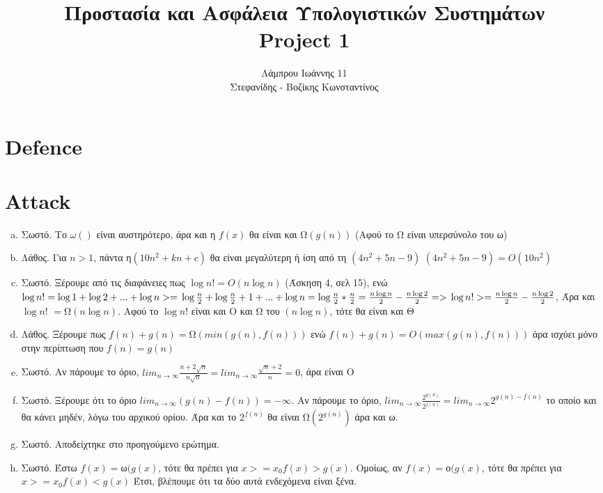 \documentclass{article}
\begin{document}
\title{\vspace{-3.5cm}\textbf{Προστασία και Ασφάλεια Υπολογιστικών Συστημάτων}\\\textlatin{Project} 1}
\author{Λάμπρου Ιωάννης 11\\ Στεφανίδης - Βοζίκης Κωνσταντίνος}

\maketitle
\section*{\textlatin{Defence}}



\section*{\textlatin{Attack}}
\begin{enumerate}[(a)]%
\item
Σωστό. Το $\omega{()}$ είναι αυστηρότερο, άρα και η $f(x)$ θα είναι και  Ω$(g(n))$ (Αφού το Ω είναι υπερσύνολο του ω)
\item
Λάθος. Για $n > 1$, πάντα η$(10n^2 + kn + c)$ θα είναι μεγαλύτερη ή ίση από τη $(4n^2 + 5n - 9)$ $(4n^2 + 5n - 9) = O(10n^2)$ 
\item
Σωστό. Ξέρουμε από τις διαφάνειες πως $\log{n!} = O(n\log{n})$ (Άσκηση 4, σελ 15), ενώ $\log{n!} = \log{1} + \log{2} + ... + \log{n} >= \\\\
 \log{\frac{n}{2}} + \log{\frac{n}{2}+1} + ... + \log{n} = \log{\frac{n}{2}}*\frac{n}{2} = \frac{n\log{n}}{2}-\frac{n\log{2}}{2} =>\\\\
\log{n!} >=  \frac{n\log{n}}{2}-\frac{n\log{2}}{2}$, Άρα και $\log{n!}$ $=$Ω$(n\log{n})$. Αφού  το $\log{n!}$ είναι και Ο και Ω του $(n\log{n})$, τότε θα είναι και Θ
\item
Λάθος. Ξέρουμε πως $f(n) + g(n) = $Ω$(min(g(n),f(n)))$ ενώ $f(n) + g(n) = O(max(g(n),f(n)))$ άρα ισχύει μόνο στην περίπτωση που $f(n) = g(n)$
\item
Σωστό. Αν πάρουμε το όριο, $ lim_{n\to\infty} \frac{n+2\sqrt{n}}{n\sqrt{n}} = lim_{n\to\infty} \frac{\sqrt{n}+2}{n} = 0$, άρα είναι O
\item
Σωστό. Ξέρουμε ότι το όριο $ lim_{n\to\infty} (g(n) - f(n)) = -\infty$. Αν πάρουμε το όριο, $ lim_{n\to\infty} \frac{2^{g(n)}}{2^{f(n)}} =  lim_{n\to\infty} 2^{g(n)-f(n)}$ το οποίο και θα κάνει μηδέν, λόγω του αρχικού ορίου. Άρα και το $2^{f(n)}$ θα είναι Ω$(2^{g(n)})$ άρα και ω.
\item
Σωστό. Αποδείχτηκε στο προηγούμενο ερώτημα.
\item
Σωστό. Έστω $f(x) = $ω$(g(x)$, τότε θα πρέπει για $x>=x_0 f(x) > g(x)$. Ομοίως, αν $f(x) = $ο$(g(x)$, τότε θα πρέπει για $x>=x_0 f(x) < g(x)$ Έτσι, βλέπουμε ότι τα δύο αυτά ενδεχόμενα είναι ξένα.

\end{enumerate}
\end{document}
